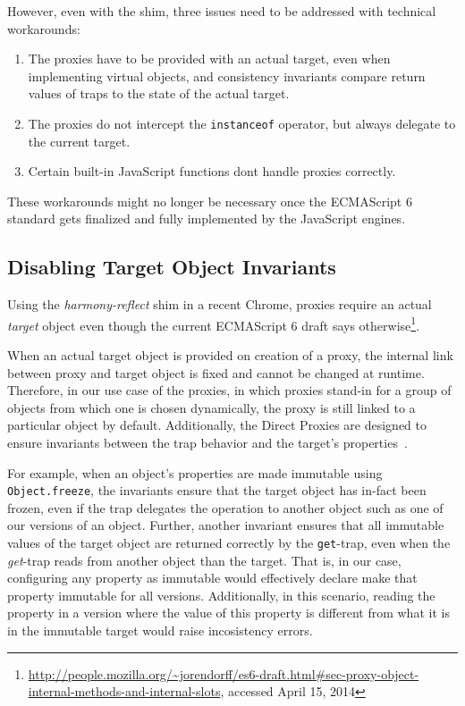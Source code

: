 However, even with the shim, three issues need to be addressed with technical workarounds:

\begin{enumerate}
    \item The proxies have to be provided with an actual target, even when implementing virtual objects, and consistency invariants compare return values of traps to the state of the actual target. 
    \item The proxies do not intercept the \lstinline{instanceof} operator, but always delegate to the current target.
    \item Certain built-in JavaScript functions dont handle proxies correctly.
\end{enumerate}

These workarounds might no longer be necessary once the ECMAScript 6 standard gets finalized and fully implemented by the JavaScript engines. 


\subsection{Disabling Target Object Invariants}


Using the \emph{harmony-reflect} shim in a recent Chrome, proxies require an actual \emph{target} object even though the current ECMAScript 6 draft says otherwise\footnote{\url{http://people.mozilla.org/~jorendorff/es6-draft.html\#sec-proxy-object-internal-methods-and-internal-slots}, accessed April 15, 2014}.

When an actual target object is provided on creation of a proxy, the internal link between proxy and target object is fixed and cannot be changed at runtime.
Therefore, in our use case of the proxies, in which proxies stand-in for a group of objects from which one is chosen dynamically, the proxy is still linked to a particular object by default.
Additionally, the Direct Proxies are designed to ensure invariants between the trap behavior and the target's properties~\cite{Cutsem2013TRP}.

For example, when an object's properties are made immutable using \lstinline{Object.freeze}, the invariants ensure that the target object has in-fact been frozen, even if the trap delegates the operation to another object such as one of our versions of an object.
Further, another invariant ensures that all immutable values of the target object are returned correctly by the \lstinline{get}-trap, even when the \emph{get}-trap reads from another object than the target. 
That is, in our case, configuring any property as immutable would effectively declare make that property immutable for all versions.
Additionally, in this scenario, reading the property in a version where the value of this property is different from what it is in the immutable target would raise incosistency errors.

